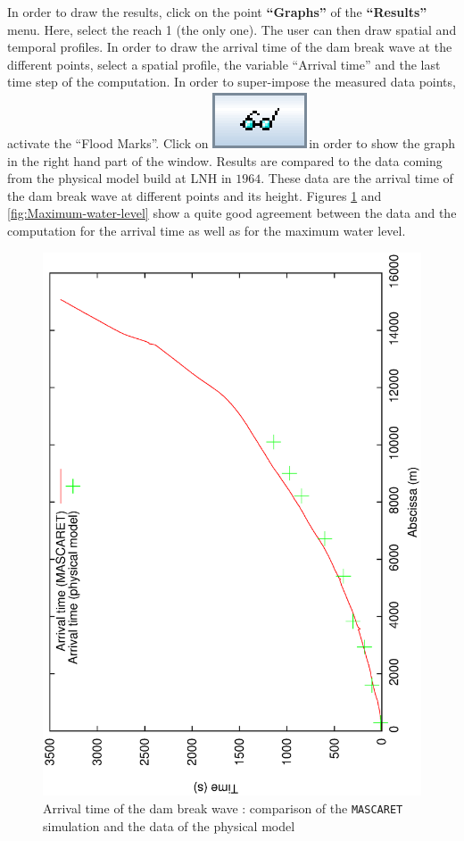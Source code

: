 \documentclass[a4paper,12pt]{article}
\begin{document}
In order to draw the results, click on the point \textbf{{}``Graphs''}
of the \textbf{{}``Results''} menu. Here, select the reach 1 (the
only one). The user can then draw spatial and temporal profiles. In
order to draw the arrival time of the dam break wave at the different
points, select a spatial profile, the variable {}``Arrival time''
and the last time step of the computation. In order to super-impose
the measured data points, activate the {}``Flood Marks''. Click
on \includegraphics[scale=0.6]{show}in
order to show the graph in the right hand part of the window. Results
are compared to the data coming from the physical model build at LNH
in $1964$. These data are the arrival time of the dam break wave at
different points and its height. Figures \ref{fig:Arrival-time} and
\ref{fig:Maximum-water-level} show a quite good agreement between
the data and the computation for the arrival time as well as for the
maximum water level.

\begin{figure}[h]
  \begin{center}
  \includegraphics[scale=0.5,angle=-90]{arrival_time}
  \caption{Arrival time of the dam break wave : comparison of the \texttt{MASCARET} simulation and the data of the physical model}
  \label{fig:Arrival-time}
  \end{center}
\end{figure}
\end{document}
